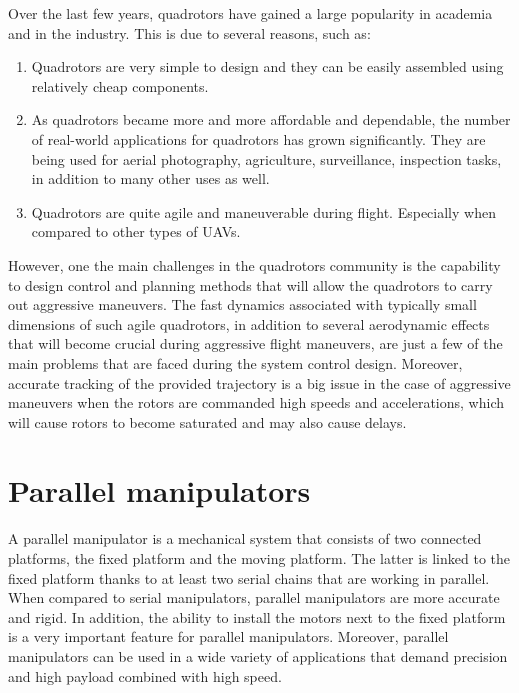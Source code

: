 \documentclass{thesisreport}
\begin{document}
Over the last few years, quadrotors have gained a large popularity in academia and in the industry. This is due to several reasons, such as: 

\begin{enumerate}

    \item Quadrotors are very simple to design and they can be easily assembled using relatively cheap components.  
    \item As quadrotors became more and more affordable and dependable, the number of real-world applications for quadrotors  has grown significantly. They are being used for aerial photography, agriculture, surveillance, inspection tasks, in addition to many other uses as well. 
    \item Quadrotors are quite agile and maneuverable during flight. Especially when compared to other types of UAVs.
    
\end{enumerate}

However, one the main challenges in the quadrotors community is the capability to design control and planning methods that will allow the quadrotors to carry out aggressive maneuvers.  The fast dynamics associated with typically small dimensions of such agile quadrotors, in addition to several aerodynamic effects that will become crucial during aggressive flight maneuvers, are just a few of the main problems that are faced during the system control design. Moreover, accurate tracking of the provided trajectory is a big issue in the case of aggressive maneuvers when the rotors are commanded high speeds and accelerations, which will cause rotors to become saturated and may also cause delays.


 \section*{Parallel manipulators}

A parallel manipulator is a mechanical system that consists of two connected platforms, the fixed platform and the moving platform. The latter is linked to the fixed platform thanks to at least two serial chains that are working in parallel. When compared to serial manipulators, parallel manipulators are more accurate and rigid. In addition, the ability to install the motors next to the fixed platform is a very important feature for parallel manipulators. Moreover, parallel manipulators can be used in a wide variety of applications that demand precision and high payload combined with high speed.\cite{Parallel_Manipulators}
\end{document}
